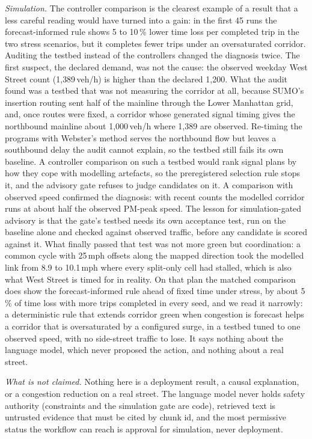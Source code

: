 \textit{Simulation.} The controller comparison is the clearest example of a result that a less careful reading
would have turned into a gain: in the first 45 runs the forecast-informed rule shows 5 to 10\,\% lower time loss per
completed trip in the two stress scenarios, but it completes fewer trips under an oversaturated corridor. Auditing
the testbed instead of the controllers changed the diagnosis twice. The first suspect, the declared demand, was not
the cause: the observed weekday West Street count (1{,}389\,veh/h) is higher than the declared 1{,}200. What the
audit found was a testbed that was not measuring the corridor at all, because SUMO's insertion routing sent half of
the mainline through the Lower Manhattan grid, and, once routes were fixed, a corridor whose generated signal timing
gives the northbound mainline about 1{,}000\,veh/h where 1{,}389 are observed. Re-timing the programs with Webster's
method serves the northbound flow but leaves a southbound delay the audit cannot explain, so the testbed still fails
its own baseline. A controller comparison on such a testbed would rank signal plans by how they cope with modelling
artefacts, so the preregistered selection rule stops it, and the advisory gate refuses to judge candidates on it. A comparison with
observed speed confirmed the diagnosis: with recent counts the modelled corridor runs at about half the observed PM-peak
speed. The lesson for simulation-gated advisory is that the gate's testbed needs its own acceptance test, run on the
baseline alone and checked against observed traffic, before any candidate is scored against it. What finally passed
that test was not more green but coordination: a common cycle with 25\,mph offsets along the mapped direction took
the modelled link from 8.9 to 10.1\,mph where every split-only cell had stalled, which is also what West Street is
timed for in reality. On that plan the matched comparison does show the forecast-informed rule ahead of fixed time
under stress, by about 5\,\% of time loss with more trips completed in every seed, and we read it narrowly: a
deterministic rule that extends corridor green when congestion is forecast helps a corridor that is oversaturated by
a configured surge, in a testbed tuned to one observed speed, with no side-street traffic to lose. It says nothing
about the language model, which never proposed the action, and nothing about a real street.

\textit{What is not claimed.} Nothing here is a deployment result, a causal explanation, or a congestion reduction
on a real street. The language model never holds safety authority (constraints and the simulation gate are code),
retrieved text is untrusted evidence that must be cited by chunk id, and the most permissive status the workflow can
reach is approval for simulation, never deployment.
